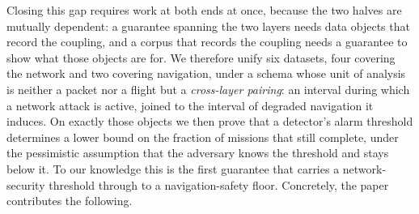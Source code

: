 Closing this gap requires work at both ends at once, because the two halves are
mutually dependent: a guarantee spanning the two layers needs data objects that
record the coupling, and a corpus that records the coupling needs a guarantee to
show what those objects are for. We therefore unify six datasets, four covering
the network and two covering navigation, under a schema whose unit of analysis
is neither a packet nor a flight but a \emph{cross-layer pairing}: an interval
during which a network attack is active, joined to the interval of degraded
navigation it induces. On exactly those objects we then prove that a detector's
alarm threshold determines a lower bound on the fraction of missions that still
complete, under the pessimistic assumption that the adversary knows the
threshold and stays below it. To our knowledge this is the first guarantee that
carries a network-security threshold through to a navigation-safety floor.
Concretely, the paper contributes the following.

